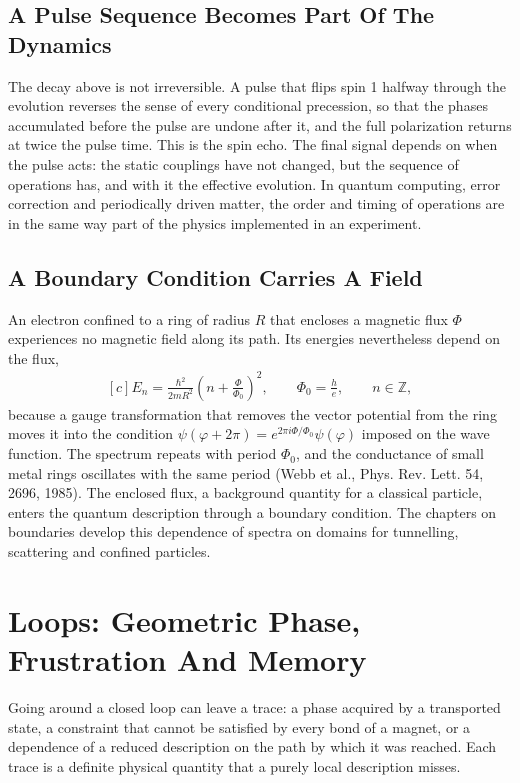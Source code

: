 \documentclass[11pt,oneside]{book}
\newenvironment{centeredalign}{\[\begin{gathered}[c]}{\end{gathered}\]}
\begin{document}
\section{A Pulse Sequence Becomes Part Of The Dynamics}
The decay above is not irreversible. A pulse that flips spin 1 halfway through the evolution reverses the sense of
every conditional precession, so that the phases accumulated before the pulse are undone after it, and the full
polarization returns at twice the pulse time. This is the spin echo. The final signal depends on when the pulse acts:
the static couplings have not changed, but the sequence of operations has, and with it the effective evolution. In
quantum computing, error correction and periodically driven matter, the order and timing of operations are in the
same way part of the physics implemented in an experiment.

\section{A Boundary Condition Carries A Field}
An electron confined to a ring of radius \(R\) that encloses a magnetic flux \(\Phi\) experiences no magnetic field
along its path. Its energies nevertheless depend on the flux,
\begin{centeredalign}
E_n=\frac{\hbar^2}{2mR^2}\left(n+\frac{\Phi}{\Phi_0}\right)^2,\qquad \Phi_0=\frac{h}{e},\qquad n\in\mathbb Z,
\end{centeredalign}
because a gauge transformation that removes the vector potential from the ring moves it into the condition
\(\psi(\varphi+2\pi)=e^{2\pi i\Phi/\Phi_0}\psi(\varphi)\) imposed on the wave function. The spectrum repeats with
period \(\Phi_0\), and the conductance of small metal rings oscillates with the same period (Webb et al., Phys. Rev.
Lett. 54, 2696, 1985). The enclosed flux, a background quantity for a classical particle, enters the quantum
description through a boundary condition. The chapters on boundaries develop this dependence of spectra on domains for
tunnelling, scattering and confined particles.



\chapter{Loops: Geometric Phase, Frustration And Memory}\label{chap:loops}
\begin{claimbox}
Going around a closed loop can leave a trace: a phase acquired by a transported state, a constraint that cannot be
satisfied by every bond of a magnet, or a dependence of a reduced description on the path by which it was reached.
Each trace is a definite physical quantity that a purely local description misses.
\end{claimbox}
\end{document}

